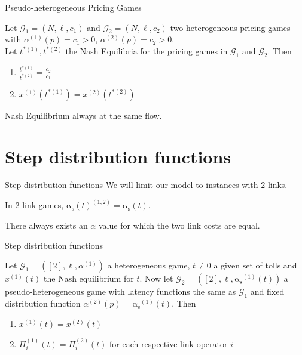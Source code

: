 \documentclass{beamer}
\newcommand{\as}{\mathrm{\alpha_s}}
\newcommand{\Gm}{\mathcal{G}}
\begin{document}
\begin{frame}{Pseudo-heterogeneous Pricing Games}
	\begin{lemma}
		Let $\Gm_1 = (N, \ell, c_1)$ and $\Gm_2 = (N, \ell, c_2)$ two heterogeneous pricing games with $\alpha^{(1)}(p) = c_1 > 0$, $\alpha^{(2)}(p) = c_2 > 0$.\\
		Let $t^{*(1)}, t^{*(2)}$ the Nash Equilibria for the pricing games in $\Gm_1$ and $\Gm_2$.
		Then
		\begin{enumerate}[$(i)$]
			\item $\frac{t^{*(1)}}{t^{*(2)}} = \frac{c_2}{c_1}$
			\item $x^{(1)}(t^{*(1)}) = x^{(2)}(t^{*(2)})$
		\end{enumerate}
	\end{lemma}
	Nash Equilibrium always at the same flow.
\end{frame}

\section{Step distribution functions}

\begin{frame}{Step distribution functions}
	We will limit our model to instances with $2$ links.

	In $2$-link games, $\as(t)^{(1, 2)} = \as(t)$.

	There always exists an $\alpha$ value for which the two link costs are equal.
\end{frame}

\begin{frame}{Step distribution functions}
	\begin{lemma}
		Let $\Gm_1 = ([2], \ell, \alpha^{(1)})$ a heterogeneous game, $t \ne 0$ a given set of tolls and $x^{(1)}(t)$ the Nash equilibrium for $t$.
		Now let $\Gm_2 = ([2], \ell, \as^{(1)}(t))$ a pseudo-heterogeneous game with latency functions the same as $\Gm_1$ and fixed distribution function $\alpha^{(2)}(p) = \as^{(1)}(t)$.
		Then
		\begin{enumerate}[$(i)$]
			\item $x^{(1)}(t) = x^{(2)}(t)$
			\item $\Pi_i^{(1)}(t) = \Pi_i^{(2)}(t)$ for each respective link operator $i$
		\end{enumerate}
	\end{lemma}
\end{frame}
\end{document}
